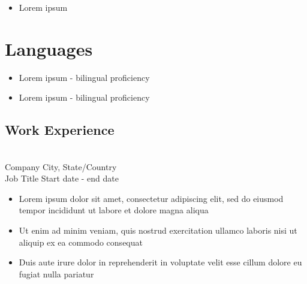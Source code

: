 \documentclass{resume_template}
\begin{document}
\begin{tcbraster}[raster columns=6,raster height=11in,raster width=8.5in,raster column skip=0in,raster row skip=0in,raster force size=false]
\begin{tcolorbox}[sidebar,raster multicolumn=2]
\begin{center}
\begin{itemize}
				\item[] Lorem ipsum \\[0.05in]
			\end{itemize}
			\end{center}
		\section*{Languages}
			\vspace*{-0.2in}
			\hrulefill
			\begin{itemize}
				\item[] Lorem ipsum - bilingual proficiency
				\item[] Lorem ipsum - bilingual proficiency
			\end{itemize}
	\end{tcolorbox}
	\begin{tcolorbox}[main,raster multicolumn=4]
		\section*{Work Experience}
			\vspace*{-0.2in}
			\hrulefill\\
			
			Company \hfill City, State/Country \\
			Job Title \hfill Start date - end date
			\begin{itemize}
				\item Lorem ipsum dolor sit amet, consectetur adipiscing elit, sed do eiusmod tempor incididunt ut labore et dolore magna aliqua
				\item Ut enim ad minim veniam, quis nostrud exercitation ullamco laboris nisi ut aliquip ex ea commodo consequat
				\item Duis aute irure dolor in reprehenderit in voluptate velit esse cillum dolore eu fugiat nulla pariatur
			\end{itemize}\break
						

\end{tcolorbox}
\end{tcbraster}
\end{document}
